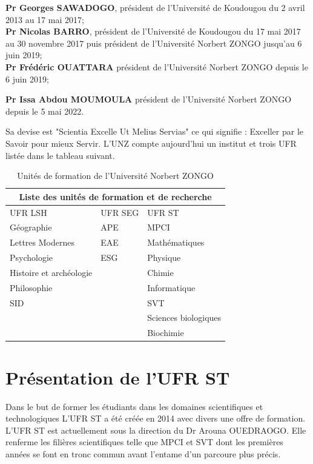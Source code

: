 \textbf{Pr Georges SAWADOGO}, président de l’Université de Koudougou du 2 avril 2013 au 17 mai 2017;\\

\textbf{Pr Nicolas BARRO}, président de l’Université de Koudougou du 17 mai 2017 au 30 novembre 2017 puis président de l’Université Norbert ZONGO jusqu’au 6 juin 2019;\\

\textbf{Pr Frédéric OUATTARA} président de l’Université Norbert ZONGO depuis le 6 juin 2019;

\textbf{Pr Issa Abdou MOUMOULA} président de l’Université Norbert ZONGO depuis le 5 mai 2022. \par
Sa devise est "Scientia Excelle Ut Melius Servias" ce qui signifie : Exceller par le Savoir pour mieux Servir.
L’UNZ compte aujourd’hui un institut et trois UFR listée dans le tableau suivant.
\begin{table}[h]
  \begin{tabular}{ |p{5cm}|p{5cm}|p{5cm}| }
\hline
\multicolumn{3}{|c|}{Liste des unités de formation et de recherche} \\
\hline
UFR LSH & UFR SEG & UFR ST \\
\hline
Géographie & APE & MPCI\\
Lettres Modernes & EAE & Mathématiques \\
Psychologie & ESG & Physique  \\
Histoire et archéologie &   & Chimie  \\
Philosophie &   & Informatique  \\
SID &   &  SVT \\
    &   &  Sciences biologiques \\
    &   &  Biochimie \\
\hline
\end{tabular}

  \caption{Unités de formation de l'Université Norbert ZONGO}
  \label{tab:Unités de formation de l'Université Norbert ZONGO}
\end{table}

\section{Présentation de l’UFR ST}
Dans le but de former les étudiants dans les domaines scientifiques et technologiques L’UFR ST a été créée en 2014 avec divers une offre de formation.
L’UFR ST est actuellement sous la direction du Dr Arouna OUEDRAOGO. Elle  renferme les filières scientifiques telle que MPCI et SVT dont les premières années se font en tronc commun avant l’entame d’un parcoure plus précis. 

